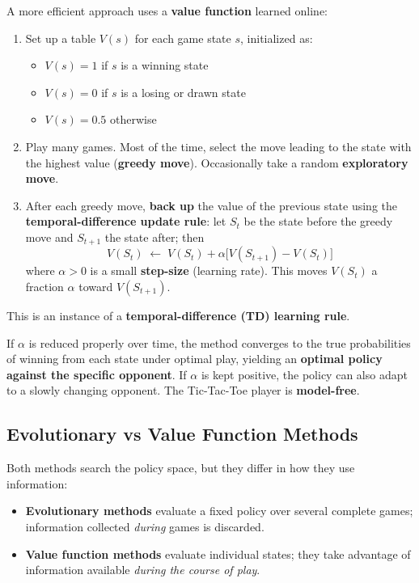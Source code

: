 \documentclass[11pt,a4paper]{article}
\theoremstyle{definition}
\theoremstyle{plain}
\theoremstyle{remark}
\begin{document}
A more efficient approach uses a \textbf{value function} learned online:

\begin{enumerate}
    \item Set up a table $V(s)$ for each game state $s$, initialized as:
    \begin{itemize}
        \item $V(s) = 1$ if $s$ is a winning state
        \item $V(s) = 0$ if $s$ is a losing or drawn state
        \item $V(s) = 0.5$ otherwise
    \end{itemize}
    \item Play many games. Most of the time, select the move leading to the state with the highest value (\textbf{greedy move}). Occasionally take a random \textbf{exploratory move}.
    \item After each greedy move, \textbf{back up} the value of the previous state using the \textbf{temporal-difference update rule}: let $S_t$ be the state before the greedy move and $S_{t+1}$ the state after; then
    \[
        V(S_t) \;\leftarrow\; V(S_t) + \alpha \bigl[V(S_{t+1}) - V(S_t)\bigr]
    \]
    where $\alpha > 0$ is a small \textbf{step-size} (learning rate). This moves $V(S_t)$ a fraction $\alpha$ toward $V(S_{t+1})$.
\end{enumerate}

This is an instance of a \textbf{temporal-difference (TD) learning rule}.

\begin{tcolorbox}[colback=blue!5!white,colframe=blue!75!black,title=\textbf{Convergence}]
If $\alpha$ is reduced properly over time, the method converges to the true probabilities of winning from each state under optimal play, yielding an \textbf{optimal policy against the specific opponent}. If $\alpha$ is kept positive, the policy can also adapt to a slowly changing opponent. The Tic-Tac-Toe player is \textbf{model-free}.
\end{tcolorbox}

\subsection{Evolutionary vs Value Function Methods}

Both methods search the policy space, but they differ in how they use information:
\begin{itemize}
    \item \textbf{Evolutionary methods} evaluate a fixed policy over several complete games; information collected \textit{during} games is discarded.
    \item \textbf{Value function methods} evaluate individual states; they take advantage of information available \textit{during the course of play}.
\end{itemize}
\end{document}
